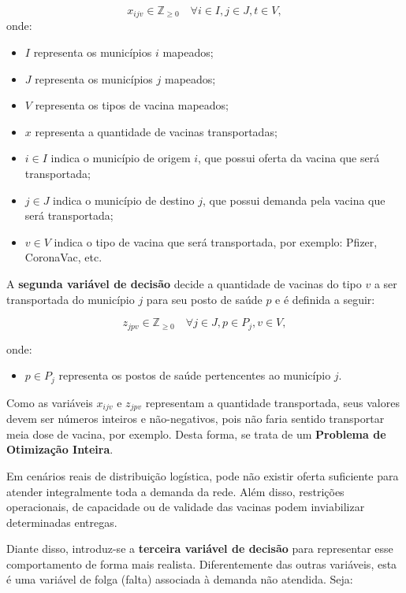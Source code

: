 \begin{equation*}
    x_{ijv} \in \mathbb{Z}_{\geq 0} \quad \forall i \in I, j \in J, t \in V,
\end{equation*}
onde:
\begin{itemize}
    \item $I$ representa os municípios $i$ mapeados;
    \item $J$ representa os municípios $j$ mapeados;
    \item $V$ representa os tipos de vacina mapeados;
    \item $x$ representa a quantidade de vacinas transportadas;
    \item $i \in I$ indica o município de origem $i$, que possui oferta da vacina que será transportada;
    \item $j \in J$ indica o município de destino $j$, que possui demanda pela vacina que será transportada;
    \item $v \in V$ indica o tipo de vacina que será transportada, por exemplo: Pfizer, CoronaVac, etc.
\end{itemize}

A \textbf{segunda variável de decisão} decide a quantidade de vacinas do tipo $v$ a ser transportada do município $j$ para seu posto de saúde $p$ e é definida a seguir:

\[
z_{jpv} \in \mathbb{Z}_{\geq 0} \quad \forall j \in J, p \in P_j, v \in V,
\]

onde:
\begin{itemize}
    \item $p \in P_j$ representa os postos de saúde pertencentes ao município $j$.
\end{itemize}

Como as variáveis $x_{ijv}$ e $z_{jpv}$ representam a quantidade transportada, seus valores devem ser números inteiros e não-negativos, pois não faria sentido transportar meia dose de vacina, por exemplo. Desta forma, se trata de um \textbf{Problema de Otimização Inteira}.

Em cenários reais de distribuição logística, pode não existir oferta suficiente para atender integralmente toda a demanda da rede. Além disso, restrições operacionais, de capacidade ou de validade das vacinas podem inviabilizar determinadas entregas. 

Diante disso, introduz-se a \textbf{terceira variável de decisão} para representar esse comportamento de forma mais realista. Diferentemente das outras variáveis, esta é uma variável de folga (falta) associada à demanda não atendida. Seja:

